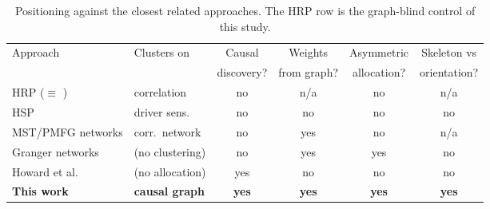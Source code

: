 \begin{table}[t]
  \centering
  \small
  \caption{Positioning against the closest related approaches. The HRP row is
  the graph-blind \HRP{} control of this study.}
  \label{tab:gap}
  \begin{tabular}{l l c c c c}
    \toprule
    Approach & Clusters on & Causal & Weights & Asymmetric & Skeleton vs \\
             &             & discovery? & from graph? & allocation? & orientation? \\
    \midrule
    HRP \cite{lopezdeprado2016hrp} ($\equiv$ \HRP{}) & correlation & no & n/a & no & n/a \\
    HSP \cite{rodriguez2023hsp}            & driver sens.\    & no  & no  & no & no \\
    MST/PMFG networks \cite{pozzi2013spread,peralta2016network} & corr.\ network & no & yes & no & n/a \\
    Granger networks \cite{vyrost2019network} & (no clustering) & no & yes & yes & no \\
    Howard et al.\ \cite{howard2025causal} & (no allocation)  & yes & no  & no & no \\
    \textbf{This work}                     & \textbf{causal graph} & \textbf{yes} & \textbf{yes} & \textbf{yes} & \textbf{yes} \\
    \bottomrule
  \end{tabular}
\end{table}
